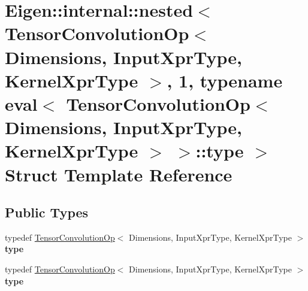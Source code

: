 \hypertarget{struct_eigen_1_1internal_1_1nested_3_01_tensor_convolution_op_3_01_dimensions_00_01_input_xpr_ty9d10111784dcaece5477fadf1d96c5f8}{}\section{Eigen\+:\+:internal\+:\+:nested$<$ Tensor\+Convolution\+Op$<$ Dimensions, Input\+Xpr\+Type, Kernel\+Xpr\+Type $>$, 1, typename eval$<$ Tensor\+Convolution\+Op$<$ Dimensions, Input\+Xpr\+Type, Kernel\+Xpr\+Type $>$ $>$\+:\+:type $>$ Struct Template Reference}
\label{struct_eigen_1_1internal_1_1nested_3_01_tensor_convolution_op_3_01_dimensions_00_01_input_xpr_ty9d10111784dcaece5477fadf1d96c5f8}
\subsection*{Public Types}
\begin{DoxyCompactItemize}
\item 
\mbox{\label{struct_eigen_1_1internal_1_1nested_3_01_tensor_convolution_op_3_01_dimensions_00_01_input_xpr_ty9d10111784dcaece5477fadf1d96c5f8_a268acf4d0531c2a53ab0268a422b02ed}} 
typedef \hyperlink{class_eigen_1_1_tensor_convolution_op}{Tensor\+Convolution\+Op}$<$ Dimensions, Input\+Xpr\+Type, Kernel\+Xpr\+Type $>$ {\bfseries type}
\item 
\mbox{\label{struct_eigen_1_1internal_1_1nested_3_01_tensor_convolution_op_3_01_dimensions_00_01_input_xpr_ty9d10111784dcaece5477fadf1d96c5f8_a268acf4d0531c2a53ab0268a422b02ed}} 
typedef \hyperlink{class_eigen_1_1_tensor_convolution_op}{Tensor\+Convolution\+Op}$<$ Dimensions, Input\+Xpr\+Type, Kernel\+Xpr\+Type $>$ {\bfseries type}
\end{DoxyCompactItemize}


